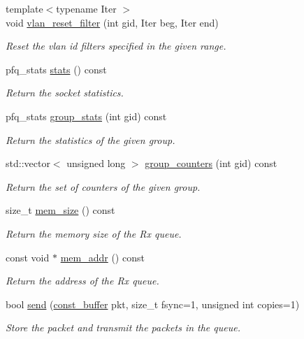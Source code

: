 \begin{DoxyCompactItemize}
{\footnotesize template$<$typename Iter $>$ }\\void \hyperlink{classpfq_1_1socket_a18efa89248a6d6bfb29d575744d21608}{vlan\+\_\+reset\+\_\+filter} (int gid, Iter beg, Iter end)
\begin{DoxyCompactList}\small\item\em Reset the vlan id filters specified in the given range. \end{DoxyCompactList}\item 
pfq\+\_\+stats \hyperlink{classpfq_1_1socket_a00e21405b0711ce7bb7a202f66487cb9}{stats} () const
\begin{DoxyCompactList}\small\item\em Return the socket statistics. \end{DoxyCompactList}\item 
pfq\+\_\+stats \hyperlink{classpfq_1_1socket_aba2cd658b52f9c00b163deb891983709}{group\+\_\+stats} (int gid) const
\begin{DoxyCompactList}\small\item\em Return the statistics of the given group. \end{DoxyCompactList}\item 
std\+::vector$<$ unsigned long $>$ \hyperlink{classpfq_1_1socket_ac1548d51e8727a57fe6e98953769bf80}{group\+\_\+counters} (int gid) const
\begin{DoxyCompactList}\small\item\em Return the set of counters of the given group. \end{DoxyCompactList}\item 
size\+\_\+t \hyperlink{classpfq_1_1socket_af4e748efa70a0b0c80eb5abf6a0d0277}{mem\+\_\+size} () const
\begin{DoxyCompactList}\small\item\em Return the memory size of the Rx queue. \end{DoxyCompactList}\item 
const void $\ast$ \hyperlink{classpfq_1_1socket_aac25000416bf154eb0e3d632e051a202}{mem\+\_\+addr} () const
\begin{DoxyCompactList}\small\item\em Return the address of the Rx queue. \end{DoxyCompactList}\item 
bool \hyperlink{classpfq_1_1socket_a6571d1041154d567abe1304e9decf656}{send} (\hyperlink{namespacepfq_ac835a1bd09b4cbaba61c100b50d0a99f}{const\+\_\+buffer} pkt, size\+\_\+t fsync=1, unsigned int copies=1)
\begin{DoxyCompactList}\small\item\em Store the packet and transmit the packets in the queue. \end{DoxyCompactList}\item 

\end{DoxyCompactItemize}
